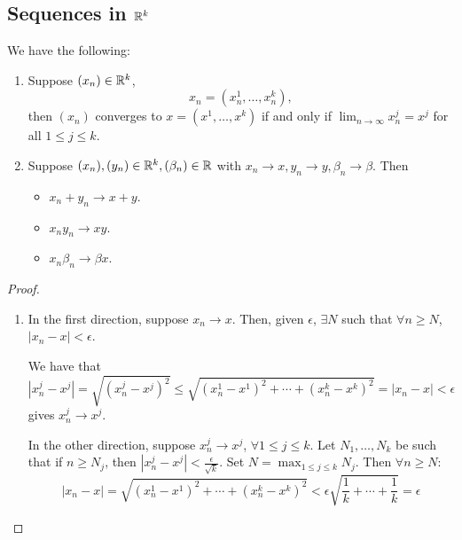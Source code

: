 \subsection{Sequences in \texorpdfstring{$\mathbb R^k$}{Rk}}
\begin{theorem}
    We have the following:
    \begin{enumerate}[(1)]
        \item Suppose $(x_n)\in \mathbb R^k$,
              \[x_n = (x_n^1, \dots, x_n^k),\]
              then $(x_n)$ converges to $x = (x^1, \dots, x^k)$ if and only if $\lim_{n\to\infty}x^j_n = x^j$ for all $1\leq j\leq k$.
        \item Suppose $(x_n), (y_n)\in \mathbb R^k, (\beta_n)\in \mathbb R$ with $x_n\to x, y_n\to y, \beta_n\to\beta$. Then
              \begin{itemize}
                  \item $x_n + y_n\to x + y$.
                  \item $x_ny_n\to xy$.
                  \item $x_n\beta_n \to\beta x$.
              \end{itemize}
    \end{enumerate}
\end{theorem}
\begin{proof}
    ~\begin{enumerate}[(1)]
        \item In the first direction, suppose $x_n \to x$. Then, given $\epsilon$, $\exists N$ such that $\forall n\geq N$, $|x_n - x| < \epsilon$.

              We have that
              \[|x^j_n - x^j| = \sqrt{(x^j_n - x^j)^2}\leq \sqrt{(x^1_n - x^1)^2 + \cdots + (x_n^k - x^k)^2} = |x_n - x|< \epsilon\]
              gives $x_n^j\to x^j$.

              In the other direction, suppose $x_n^j \to x^j$, $\forall 1\leq j\leq k$. Let $N_1, \dots, N_k$ be such that if $n\geq N_j$, then $|x_n^j - x^j| < \frac{\epsilon}{\sqrt{k}}$. Set $N = \max_{1\leq j\leq k} N_j$. Then $\forall n\geq N$:
              \[|x_n - x| = \sqrt{(x^1_n - x^1)^2 + \cdots + (x_n^k - x^k)^2} < \epsilon \sqrt{\frac{1}{k}+ \cdots + \frac{1}{k}} = \epsilon\]
    \end{enumerate}
\end{proof}

